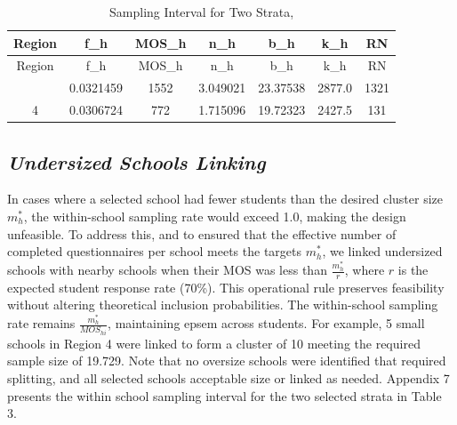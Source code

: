 \documentclass[
  12pt]{article}
\begin{document}
\begin{longtable}[]{@{}ccccccc@{}}
\caption{Sampling Interval for Two Strata,}\tabularnewline
\toprule\noalign{}
Region & f\_h & MOS\_h & n\_h & b\_h & k\_h & RN \\
\midrule\noalign{}
\endfirsthead
\toprule\noalign{}
Region & f\_h & MOS\_h & n\_h & b\_h & k\_h & RN \\
\midrule\noalign{}
\endhead
\bottomrule\noalign{}
\endlastfoot
3 & 0.0321459 & 1552 & 3.049021 & 23.37538 & 2877.0 & 1321 \\
4 & 0.0306724 & 772 & 1.715096 & 19.72323 & 2427.5 & 131 \\
\end{longtable}

\subsection{\texorpdfstring{\emph{Undersized Schools
Linking}}{Undersized Schools Linking}}\label{undersized-schools-linking}

In cases where a selected school had fewer students than the desired
cluster size \(m^*_h\), the within-school sampling rate would exceed
1.0, making the design unfeasible. To address this, and to ensured that
the effective number of completed questionnaires per school meets the
targets \(m^*_h\), we linked undersized schools with nearby schools when
their MOS was less than \(\frac{m^*_h}{r}\), where \(r\) is the expected
student response rate (70\%). This operational rule preserves
feasibility without altering theoretical inclusion probabilities. The
within-school sampling rate remains \(\frac{m^*_h}{MOS_{hi}}\),
maintaining epsem across students. For example, 5 small schools in
Region 4 were linked to form a cluster of 10 meeting the required sample
size of 19.729. Note that no oversize schools were identified that
required splitting, and all selected schools acceptable size or linked
as needed. Appendix 7 presents the within school sampling interval for
the two selected strata in Table 3.
\end{document}
